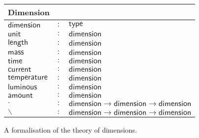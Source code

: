 \begin{figure}[h]
  \begin{center}
    \begin{tabular}{|l c l|}
      \hline
      \textsf{Dimension} & &\\\hline
      $\mathsf{dimension}$ & $:$ & $ \mathsf{type}$\\

      $\mathsf{unit}$ & $:$ & $ \mathsf{dimension}$\\
      $\mathsf{length}$ & $:$ & $ \mathsf{dimension}$\\
      $\mathsf{mass}$ & $:$ & $ \mathsf{dimension}$\\
      $\mathsf{time}$ & $:$ & $ \mathsf{dimension}$\\
      $\mathsf{current}$ & $:$ & $ \mathsf{dimension}$\\
      $\mathsf{temperature}$ & $:$ & $ \mathsf{dimension}$\\
      $\mathsf{luminous}$ & $:$ & $ \mathsf{dimension}$\\
      $\mathsf{amount}$ & $:$ & $ \mathsf{dimension}$\\

      $\cdot{}$ & $:$ & $ \mathsf{dimension} \rightarrow \mathsf{dimension} \rightarrow \mathsf{dimension}$\\
      $\backslash$ & $:$ & $ \mathsf{dimension} \rightarrow \mathsf{dimension} \rightarrow \mathsf{dimension}$\\\hline
    \end{tabular}
  \end{center}
  \caption{A formalisation of the theory of dimensions. }
  \label{fig:dimensions}
\end{figure}

